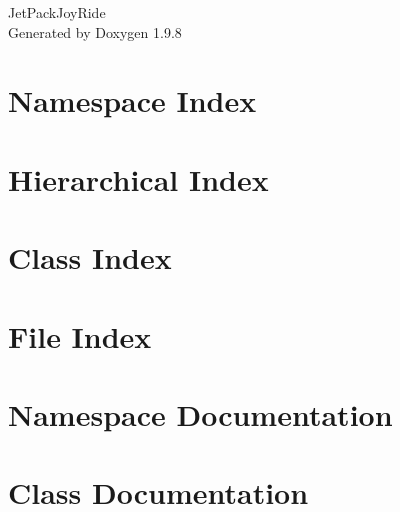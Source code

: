 \documentclass[twoside]{book}
\newcommand{\+}{\discretionary{\mbox{\scriptsize$\hookleftarrow$}}{}{}}
\newcommand{\clearemptydoublepage}{%
    \newpage{\pagestyle{empty}\cleardoublepage}%
  }
\begin{document}
  \raggedbottom
    \hypersetup{pageanchor=false,
                bookmarksnumbered=true,
                pdfencoding=unicode
               }
  \begin{titlepage}
  \vspace*{7cm}
  \begin{center}%
  {\Large Jet\+Pack\+Joy\+Ride}\\
  \vspace*{1cm}
  {\large Generated by Doxygen 1.9.8}\\
  \end{center}
  \end{titlepage}
  \clearemptydoublepage
  \tableofcontents
  \clearemptydoublepage
  \hypersetup{pageanchor=true}

\chapter{Namespace Index}

\chapter{Hierarchical Index}

\chapter{Class Index}

\chapter{File Index}

\chapter{Namespace Documentation}

\chapter{Class Documentation}

































\end{document}
